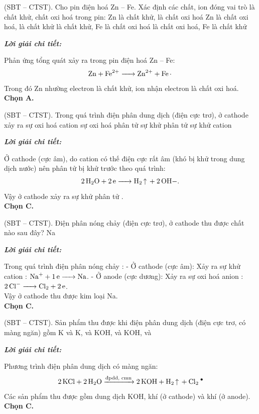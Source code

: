 \documentclass[11pt,a4paper]{article}
\def\loigiai#1{
\par\begingroup\color{blue!80!black}\small
\noindent\textbf{\textit{Lời giải chi tiết:}}\par
#1\par\endgroup}
\begin{document}
\begin{ex}
(SBT – CTST). Cho pin điện hoá Zn – Fe. Xác định các chất, ion đóng vai trò là chất khử, chất oxi hoá trong pin:
\choice
{\True Zn là chất khử,  là chất oxi hoá}
{Zn là chất oxi hoá,  là chất khử}
{ là chất khử, Fe là chất oxi hoá}
{ là chất oxi hoá, Fe là chất khử}
\loigiai{
Phản ứng tổng quát xảy ra trong pin điện hoá Zn -- Fe:
$$\ce{Zn + Fe^2+ -> Zn^2+ + Fe.}$$
Trong đó Zn nhường electron là chất khử, ion \ce{Fe^2+} nhận electron là chất oxi hoá.\\
\textbf{Chọn A.}}
\end{ex}



\begin{ex}
(SBT – CTST). Trong quá trình điện phân dung dịch  (điện cực trơ), ở cathode xảy ra
\choice
{sự oxi hoá cation }
{sự oxi hoá phân tử }
{\True sự khử phân tử }
{sự khử cation }
\loigiai{
Ở cathode (cực âm), do cation \ce{Na+} có thế điện cực rất âm (khó bị khử trong dung dịch nước) nên phân tử \ce{H2O} bị khử trước theo quá trình:
$$\ce{2H2O + 2e -> H2 ^ + 2OH-.}$$
Vậy ở cathode xảy ra sự khử phân tử \ce{H2O}.\\
\textbf{Chọn C.}}
\end{ex}

\begin{ex}
(SBT – CTST). Điện phân nóng chảy  (điện cực trơ), ở cathode thu được chất nào sau đây?
\choice
{}
{}
{\True Na}
{}
\loigiai{
Trong quá trình điện phân nóng chảy :
- Ở cathode (cực âm): Xảy ra sự khử cation \ce{Na+}: $\ce{Na+ + 1e -> Na}$.
- Ở anode (cực dương): Xảy ra sự oxi hoá anion \ce{Cl-}: $\ce{2Cl- -> Cl2 + 2e}$.\\
Vậy ở cathode thu được kim loại Na.\\
\textbf{Chọn C.}}
\end{ex}

\begin{ex}
(SBT – CTST). Sản phẩm thu được khi điện phân dung dịch  (điện cực trơ, có màng ngăn) gồm
\choice
{K và }
{K,  và }
{\True KOH,  và }
{KOH,  và }
\loigiai{
Phương trình điện phân dung dịch  có màng ngăn:
$$\ce{2KCl + 2H2O ->[\text{đpdd, cmn}] 2KOH + H2 ^ + Cl2 ^.}$$
Các sản phẩm thu được gồm dung dịch KOH, khí \ce{H2} (ở cathode) và khí \ce{Cl2} (ở anode).\\
\textbf{Chọn C.}}
\end{ex}
\end{document}
